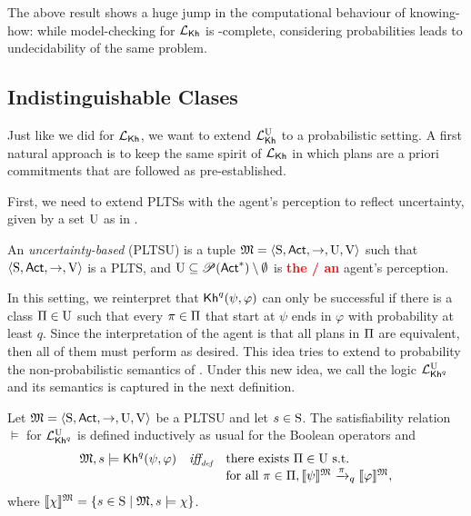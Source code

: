 The above result shows a huge jump in the computational behaviour of
knowing-how: while model-checking for $\Khlogic$ is \PSPACE-complete,
considering probabilities leads to undecidability of the same problem.


\subsection{Indistinguishable Clases}\label{subsec:prob:indist:committed}

Just like we did for $\Khlogic$, we want to extend $\Khunc$ to a
probabilistic setting.  A first natural approach is to keep the same
spirit of $\Khlogic$ in which plans are a priori commitments that are
followed as pre-established.

First, we need to extend PLTSs with the agent's perception to
reflect uncertainty, given by a set $\Unc$ as in
.

\begin{definition}\label{def:pltsu}
    An \emph{uncertainty-based \lts} (PLTSU) is a tuple
    $\model=\tup{\S,\Act,\ra,\Unc,\V}$ such that
    $\tup{\S,\Act,\ra,\V}$ is a PLTS, and $\Unc\subseteq
    \powerset(\Act^*)\setminus \emptyset$ is \textcolor{red}{\bf the / an} agent's perception.
\end{definition}

In this setting, we reinterpret that $\kh^q(\psi,\varphi)$ can only be
successful if there is a class $\plans\in\Unc$ such that every
$\plan\in\plans$ that start at $\psi$ ends in $\varphi$ with
probability at least $q$.  Since the interpretation of the agent is
that all plans in $\plans$ are equivalent, then all of them must 
perform as desired.  This idea tries to extend to probability the
non-probabilistic semantics of .
Under this new idea, we call the logic $\PKhunc$ and its semantics is
captured in the next definition.


\begin{definition}\label{def:semantics:PKhunc}
  Let $\model = \tup{\S,\Act,\ra,\Unc,\V}$ be a PLTSU and let $s\in\S$.  The
  satisfiability relation $\models$ for $\PKhunc$ is defined inductively 
  as usual for the Boolean operators and
  \[
  \begin{array}{l@{\ \ \ }c@{\ \ \  }l}
    \model, s \models \kh^q(\psi,\varphi) & \iffdef &  \text{there exists } {\plans \in \Unc} \text{ s.t.} \\
    & & \text{for all } {\plan\in\plans}, {\truthset{\model}{\psi} \reach{\plan}_q \truthset{\model}{\varphi}}, 
  \end{array}
  \]    
  where $\truthset{\model}{\chi} = \csetsc{s\in\S}{\model,s\models\chi}$.
\end{definition}

